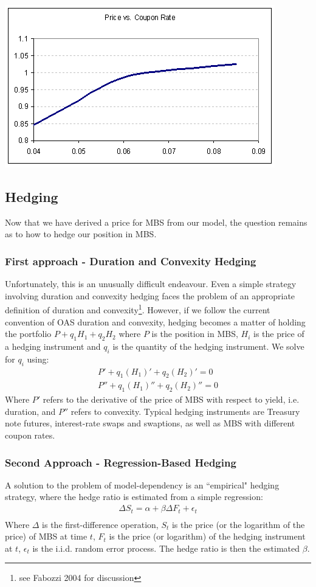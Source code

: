 \documentclass[10pt,letterpaper]{article}
\begin{document}
\begin{center}
\includegraphics[scale=0.7]{negconvexity.png}\\
\end{center}
\subsection{Hedging}
Now that we have derived a price for MBS from our model, the question remains as to how to hedge our position in MBS.
\subsubsection{First approach - Duration and Convexity Hedging}
Unfortunately, this is an unusually difficult endeavour. Even a simple strategy involving duration and convexity hedging faces the problem of an appropriate definition of duration and convexity\footnote{see Fabozzi 2004 for discussion}.  However, if we follow the current convention of OAS duration and convexity, hedging becomes a matter of holding the portfolio $P + q_1 H_1 + q_2 H_2$ where $P$ is the position in MBS, $H_i$ is the price of a hedging instrument and $q_i$ is the quantity of the hedging instrument. We solve for $q_i$ using:
\begin{eqnarray}
P' + q_1 (H_1)' + q_2 (H_2)' = 0\\
P'' + q_1 (H_1)'' + q_2 (H_2)'' = 0
\end{eqnarray}
Where $P'$ refers to the derivative of the price of MBS with respect to yield, i.e. duration, and $P''$ refers to convexity. Typical hedging instruments are Treasury note futures, interest-rate swaps and swaptions, as well as MBS with different coupon rates.
\subsubsection{Second Approach - Regression-Based Hedging}
A solution to the problem of model-dependency is an ``empirical" hedging strategy, where the hedge ratio is estimated from a simple regression:
\begin{eqnarray}
\Delta S_t = \alpha + \beta \Delta F_t + \epsilon_t \\
\end{eqnarray}
Where $\Delta$ is the first-difference operation, $S_t$ is the price (or the logarithm of the price) of MBS at time $t$, $F_t$ is the price (or logarithm) of the hedging instrument at $t$, $\epsilon_t$ is the i.i.d. random error process. The hedge ratio is then the estimated $\beta$.
\end{document}
